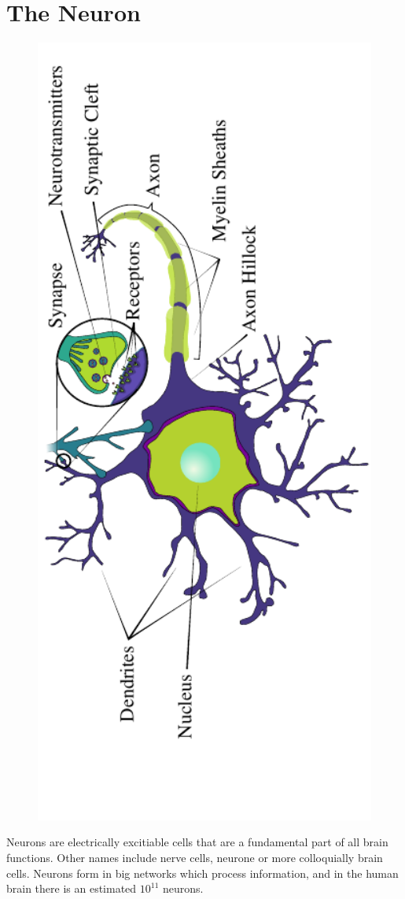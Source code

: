 \documentclass[altfont, fleqn]{uiophd}
\begin{document}
\section{The Neuron}
\begin{figure}[h]
    \centering
    \includegraphics[angle=-90,width=1.0\textwidth]{images/2_1/neuron_structure.pdf}
    \caption{}
    \label{fig:2_1_neuron}
\end{figure}
\noindent
Neurons 
are electrically excitiable cells
that are a fundamental part of all brain functions.
Other names include {nerve cells}, {neurone} or more 
colloquially {brain cells}.
Neurons form in big networks 
which process information,
and in the human brain there is an estimated $10^{11}$ neurons.
\end{document}

